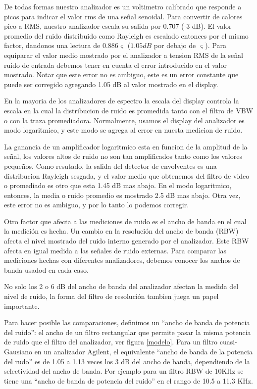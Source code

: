 \documentclass[a4paper,12pt,twoside]{article}
\newcommand{\quotes}[1]{``#1''}
\begin{document}
De todas formas nuestro analizador es un voltimetro calibrado que responde a picos para indicar el valor rms de una señal senoidal. Para convertir de calores pico a RMS, nuestro analizador escala su salida por $0.707$ (-3 dB). El valor promedio del ruido distribuido como Rayleigh es escalado entonces por el mismo factor, dandonos una lectura de $0.886 \upvarsigma$ ($1.05 dB$ por debajo de $\upvarsigma$). Para equiparar el valor medio mostrado por el analizador a tension RMS de la señal ruido de entrada debemos tener en cuenta el error introducido en el valor mostrado. Notar que este error no es ambiguo, este es un error constante que puede ser corregido agregando 1.05 dB al valor mostrado en el display.\newline

En la mayoria de los analizadores de espectro la escala del display controla la escala en la cual la distribucion de ruido es promedida tanto con el filtro de VBW o con la traza promediadora. Normalmente, usamos el display del analizador es modo logaritmico, y este modo se agrega al error en nuesta medicion de ruido.\newline

La ganancia de un amplificador logaritmico esta en funcion de la amplitud de la señal, los valores altos de ruido no son tan amplificados tanto como los valores pequeños. Como resutado, la salida del detector de envolventes es una distribucion Rayleigh sesgada, y el valor medio que obtenemos del filtro de video o promediado es otro que esta 1.45 dB mas abajo. En el modo logaritmico, entonces, la media o ruido promedio es mostrado 2.5 dB mas abajo.
Otra vez, este error no es ambiguo, y por lo tanto lo podemos corregir.\newline

Otro factor que afecta a las mediciones de ruido es el ancho de banda en el cual la medición es hecha. Un cambio en la resolución del ancho de banda (RBW) afecta el nivel mostrado del ruido interno generado por el analizador. Este RBW afecta en igual medida a las señales de ruido externas. Para comparar las mediciones hechas con diferentes analizadores, debemos conocer los anchos de banda usadod en cada caso.\newline

No solo los 2 o 6 dB del ancho de banda del analizador afectan la medida del nivel de ruido, la forma del filtro  de resolución tambien juega un papel importante.\newline

Para hacer posible las comparaciones, definimos un \quotes{ancho de banda de potencia del ruido}: el ancho de un filtro rectangular que permite pasar la misma potencia de ruido que el filtro del  analizador, ver figura \ref{modelo}. Para un filtro cuasi-Gausiano en un analizador Agilent, el equivalente \quotes{ancho de banda de la potencia del rudo} es de 1.05 a 1.13 veces los 3 dB del ancho de banda, dependiendo de la selectividad del ancho de banda. Por ejemplo para un filtro RBW de 10KHz se tiene una \quotes{ancho de banda de potencia del ruido} en el rango de 10.5 a 11.3 KHz.\newline
\end{document}
